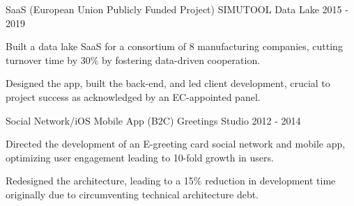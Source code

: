 \begin{cventries}

  \cventry
    {SaaS (European Union Publicly Funded Project)} %
    {SIMUTOOL Data Lake} %
    {2015 - 2019} %
    {} %
    {
          \begin{cvitems} %
			\item {Built a data lake SaaS for a consortium of 8 manufacturing companies, cutting turnover time by 30\% by fostering data-driven cooperation.} 
			\item {Designed the app, built the back-end, and led client development, crucial to project success as acknowledged by an EC-appointed panel.}
	      \end{cvitems}
    }
    



  \cventry
    {Social Network/iOS Mobile App (B2C)} %
    {Greetings Studio} %
    {2012 - 2014} %
    {} %
    {
          \begin{cvitems} %
				\item {Directed the development of an E-greeting card social network and mobile app, optimizing user engagement leading to 10-fold growth in users.}
				\item {Redesigned the architecture, leading to a 15\% reduction in development time originally due to circumventing technical architecture debt.}
	      \end{cvitems}
    }
    

\end{cventries}
